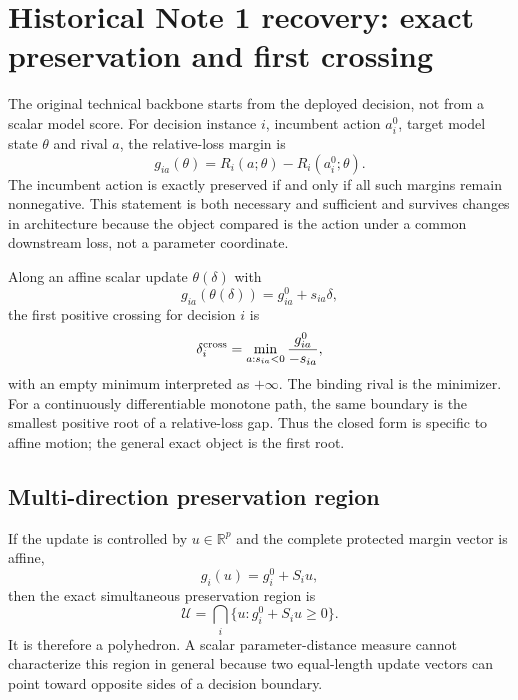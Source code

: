 \documentclass[11pt,letterpaper]{article}
\theoremstyle{plain}
\newcommand{\R}{\mathbb R}
\newcommand{\1}{\mathbf 1}
\begin{document}
\clearpage
\section{Historical Note 1 recovery: exact preservation and first crossing}
The original technical backbone starts from the deployed decision, not from a scalar model score. For decision instance $i$, incumbent action $a_i^0$, target model state $\theta$ and rival $a$, the relative-loss margin is
\begin{equation}
 g_{ia}(\theta)=R_i(a;\theta)-R_i(a_i^0;\theta).
\end{equation}
The incumbent action is exactly preserved if and only if all such margins remain nonnegative. This statement is both necessary and sufficient and survives changes in architecture because the object compared is the action under a common downstream loss, not a parameter coordinate.

Along an affine scalar update $\theta(\delta)$ with
\begin{equation}
 g_{ia}(\theta(\delta))=g_{ia}^0+s_{ia}\delta,
\end{equation}
the first positive crossing for decision $i$ is
\begin{equation}
 \delta_i^{\rm cross}=\min_{a:s_{ia}<0}\frac{g_{ia}^0}{-s_{ia}},
\end{equation}
with an empty minimum interpreted as $+\infty$. The binding rival is the minimizer. For a continuously differentiable monotone path, the same boundary is the smallest positive root of a relative-loss gap. Thus the closed form is specific to affine motion; the general exact object is the first root.

\subsection{Multi-direction preservation region}
If the update is controlled by $u\in\R^p$ and the complete protected margin vector is affine,
\begin{equation}
 g_i(u)=g_i^0+S_i u,
\end{equation}
then the exact simultaneous preservation region is
\begin{equation}
 \mathcal U=\bigcap_i\{u:g_i^0+S_i u\ge0\}.
\end{equation}
It is therefore a polyhedron. A scalar parameter-distance measure cannot characterize this region in general because two equal-length update vectors can point toward opposite sides of a decision boundary.
\end{document}
